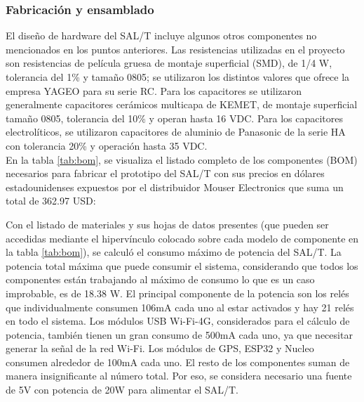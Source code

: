\subsubsection{Fabricación y ensamblado}

El diseño de hardware del SAL/T incluye algunos otros componentes no mencionados en los puntos anteriores. Las resistencias utilizadas en el proyecto son resistencias de película gruesa de montaje superficial (SMD), de 1/4 W, tolerancia del 1\% y tamaño 0805; se utilizaron los distintos valores que ofrece la empresa YAGEO para su serie RC. Para los capacitores se utilizaron generalmente capacitores cerámicos multicapa de KEMET, de montaje superficial tamaño 0805, tolerancia del 10\% y operan hasta 16 VDC. Para los capacitores electrolíticos, se utilizaron capacitores de aluminio de Panasonic de la serie HA con tolerancia 20\% y operación hasta 35 VDC. \\ 

En la tabla \ref{tab:bom}, se visualiza el listado completo de los componentes (BOM) necesarios para fabricar el prototipo del SAL/T con sus precios en dólares estadounidenses expuestos por el distribuidor Mouser Electronics que suma un total de 362.97 USD: 




Con el listado de materiales y sus hojas de datos presentes (que pueden ser accedidas mediante el hipervínculo colocado sobre cada modelo de componente en la tabla \ref{tab:bom}), se calculó el consumo máximo de potencia del SAL/T. La potencia total máxima que puede consumir el sistema, considerando que todos los componentes están trabajando al máximo de consumo lo que es un caso improbable, es de 18.38 W. El principal componente de la potencia son los relés que individualmente consumen 106mA cada uno al estar activados y hay 21 relés en todo el sistema. Los módulos USB Wi-Fi-4G, considerados para el cálculo de potencia, también tienen un gran consumo de 500mA cada uno, ya que necesitar generar la señal de la red Wi-Fi. Los módulos de GPS, ESP32 y Nucleo consumen alrededor de 100mA cada uno. El resto de los componentes suman de manera insignificante al número total. Por eso, se considera necesario una fuente de 5V con potencia de 20W para alimentar el SAL/T. \\


